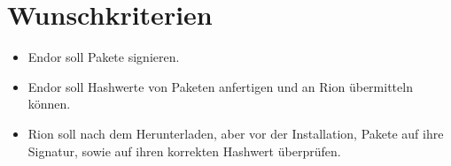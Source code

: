 \section{Wunschkriterien}
\begin{itemize}
	\item Endor soll Pakete signieren.
	\item Endor soll Hashwerte von Paketen anfertigen und an Rion übermitteln können.
	\item Rion soll nach dem Herunterladen, aber vor der Installation, Pakete auf ihre Signatur, sowie auf ihren korrekten Hashwert überprüfen.

\end{itemize}